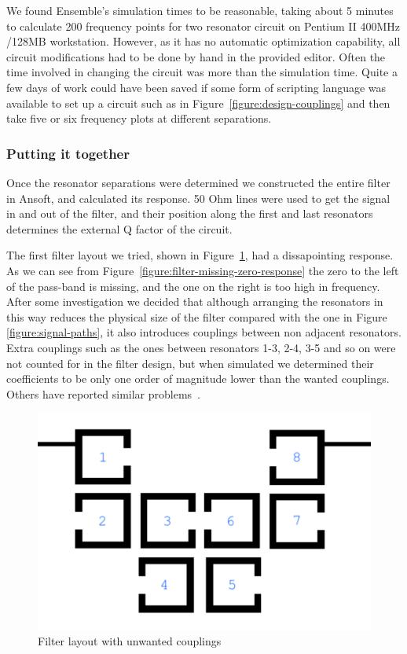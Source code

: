 We found Ensemble's simulation times to be reasonable, taking about 5 minutes to calculate 200 frequency points for two resonator circuit on Pentium II 400MHz /128MB workstation. However, as it has no automatic optimization capability, all circuit modifications had to be done by hand in the provided editor. Often the time involved in changing the circuit was more than the simulation time. Quite a few days of work could have been saved if some form of scripting language was available to set up a circuit such as in Figure~\ref{figure:design-couplings} and then take five or six frequency plots at different separations.


\subsubsection{Putting it together}
Once the resonator separations were determined we constructed the entire filter in Ansoft, and calculated its response. 50 Ohm lines were used to get the signal in and out of the filter, and their position along the first and last resonators determines the external Q factor of the circuit.

The first filter layout we tried, shown in Figure~\ref{figure:filter-missing-zero-layout}, had a dissapointing response. As we can see from Figure~\ref{figure:filter-missing-zero-response} the zero to the left of the pass-band is missing, and the one on the right is too high in frequency. After some investigation we decided that although arranging the resonators in this way reduces the physical size of the filter compared with the one in Figure \ref{figure:signal-paths}, it also introduces couplings between non adjacent resonators. Extra couplings such as the ones between resonators 1-3, 2-4, 3-5 and so on were not counted for in the filter design, but when simulated we determined their coefficients to be only one order of magnitude lower than the wanted couplings. Others have reported similar problems~\cite{hong:performance}. 

\begin{figure}[ht]
\begin{center}
\includegraphics[scale=0.4]{fig/design-bad-8-pole-layout.pdf}
\end{center}
\caption{Filter layout with unwanted couplings}
\label{figure:filter-missing-zero-layout}
\end{figure}

